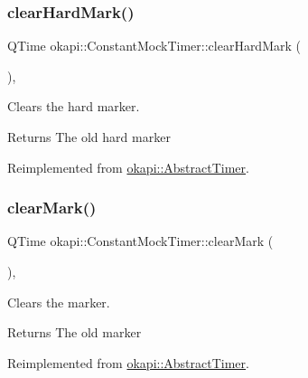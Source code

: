 \subsubsection{\texorpdfstring{clearHardMark()}{clearHardMark()}}
{\footnotesize\ttfamily Q\+Time okapi\+::\+Constant\+Mock\+Timer\+::clear\+Hard\+Mark (\begin{DoxyParamCaption}{ }\end{DoxyParamCaption})\hspace{0.3cm}{\ttfamily [override]}, {\ttfamily [virtual]}}



Clears the hard marker. 

\begin{DoxyReturn}{Returns}
The old hard marker 
\end{DoxyReturn}


Reimplemented from \mbox{\hyperlink{classokapi_1_1AbstractTimer_af462e941170d1659dd04ab9d1ead3968}{okapi\+::\+Abstract\+Timer}}.

\mbox{\label{classokapi_1_1ConstantMockTimer_a3647290602451f48b7fb90a80f43b2dd}} 
\subsubsection{\texorpdfstring{clearMark()}{clearMark()}}
{\footnotesize\ttfamily Q\+Time okapi\+::\+Constant\+Mock\+Timer\+::clear\+Mark (\begin{DoxyParamCaption}{ }\end{DoxyParamCaption})\hspace{0.3cm}{\ttfamily [override]}, {\ttfamily [virtual]}}



Clears the marker. 

\begin{DoxyReturn}{Returns}
The old marker 
\end{DoxyReturn}


Reimplemented from \mbox{\hyperlink{classokapi_1_1AbstractTimer_a78d62559bbd51a71372f37920af78261}{okapi\+::\+Abstract\+Timer}}.

\mbox{\label{classokapi_1_1ConstantMockTimer_a35956bfe4078dbf73d67828cb41f9e26}} 
